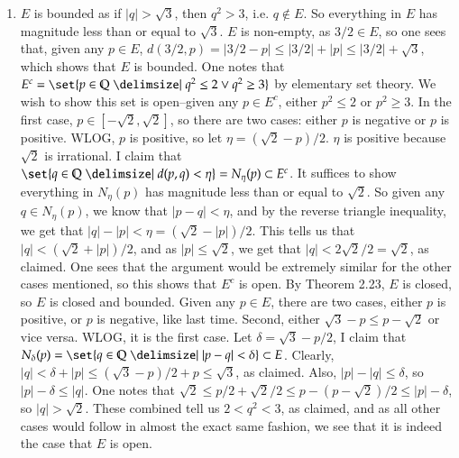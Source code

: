 \documentclass[12pt]{article}
\def\mbb#1{\mathbb{#1}}
\def\bQ{\mbb{Q}}
\theoremstyle{definition}
\theoremstyle{remark}
\begin{document}
\begin{enumerate}[leftmargin=\labelsep]
		\item $E$ is bounded as if $|q| > \sqrt{3}$, then $q^2 > 3$, i.e. $q \not \in E$. So everything in $E$ has magnitude less than or equal to $\sqrt{3}$. $E$ is non-empty, as $3/2 \in E$, so one sees that, given any $p \in E$, $d(3/2, p) = |3/2-p| \leq |3/2| + |p| \leq |3/2| + \sqrt{3}$, which shows that $E$ is bounded. One notes that $E^c = \set{p \in \bQ \given q^2 \leq 2 \lor q^2 \geq 3}$ by elementary set theory. We wish to show this set is open--given any $p \in E^c$, either $p^2 \leq 2$ or $p^2 \geq 3$. In the first case, $p \in [-\sqrt{2}, \sqrt{2}]$, so there are two cases: either $p$ is negative or $p$ is positive. WLOG, $p$ is positive, so let $\eta = (\sqrt{2}-p)/2$. $\eta$ is positive because $\sqrt{2}$ is irrational. I claim that $\set{q \in \bQ \given d(p, q) < \eta} = N_\eta(p) \subset E^c$. It suffices to show everything in $N_\eta(p)$ has magnitude less than or equal to $\sqrt{2}$. So given any $q \in N_\eta(p)$, we know that $|p-q| < \eta$, and by the reverse triangle inequality, we get that $|q| - |p| < \eta = (\sqrt{2}-|p|)/2$. This tells us that $|q| < (\sqrt{2}+|p|)/2$, and as $|p| \leq \sqrt{2}$, we get that $|q| < 2\sqrt{2}/2 = \sqrt{2}$, as claimed. One sees that the argument would be extremely similar for the other cases mentioned, so this shows that $E^c$ is open. By Theorem 2.23, $E$ is closed, so $E$ is closed and bounded. Given any $p \in E$, there are two cases, either $p$ is positive, or $p$ is negative, like last time. Second, either $\sqrt{3}-p \leq p-\sqrt{2}$ or vice versa. WLOG, it is the first case. Let $\delta = \sqrt{3}-p/2$, I claim that $N_\delta(p) = \set{q \in \bQ \given |p-q| < \delta} \subset E$. Clearly, $|q| < \delta + |p| \leq (\sqrt{3}-p)/2 + p \leq \sqrt{3}$, as claimed. Also, $|p| - |q| \leq \delta$, so $|p| - \delta \leq |q|$. One notes that $\sqrt{2} \leq p/2 + \sqrt{2}/2 \leq p - (p - \sqrt{2})/2 \leq |p| - \delta$, so $|q| > \sqrt{2}$. These combined tell us $2 < q^2 < 3$, as claimed, and as all other cases would follow in almost the exact same fashion, we see that it is indeed the case that $E$ is open.
	\end{enumerate}
\end{document}
